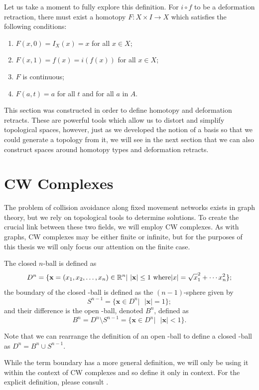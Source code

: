 Let us take a moment to fully explore this definition. For $i \circ f$ to be a deformation retraction, there must exist a homotopy $F\colon X\times I \rightarrow X$ which satisfies the following conditions:
\begin{enumerate}
\item $F(x,0)=I_X(x)=x$ for all $x \in X$;

\item $F(x,1)=f(x)=i(f(x))$ for all $x\in X$;

\item $F$ is continuous;
\item $F(a,t)=a$ for all $t$ and for all $a$ in $A$.
\end{enumerate}

This section was constructed in order to define homotopy and deformation retracts. These are powerful tools which allow us to distort and simplify topological spaces, however, just as we developed the notion of a basis so that we could generate a topology from it, we will see in the next section that we can also construct spaces around homotopy types and deformation retracts.



\section{CW Complexes}
The problem of collision avoidance along fixed movement networks exists in graph theory, but we rely on topological tools to determine solutions. To create the crucial link between these two fields, we will employ CW complexes. As with graphs, CW complexes may be either finite or infinite, but for the purposes of this thesis we will only focus our attention on the finite case.

\begin{defn}
The closed $n$-ball is defined as $$D^n=\{\textbf{x}=(x_1,x_2,\dots, x_n)\in \mathbb{R}^n |\text{  } |\textbf{x}| \leq 1 \text{ where} |x|=\sqrt x_1^2+\cdots x_n^2
 \};$$ the boundary of the closed \n-ball is defined as the $(n-1)$-sphere given by $$ S^{n-1} = \{\textbf{x}\in D^n | \text{  } |\textbf{x}|=1\};$$ and their difference is the open \n-ball, denoted $B^n$, defined as $$B^n = D^n \setminus S^{n-1} = \{\textbf{x}\in D^n | \text{  } |\textbf{x}|< 1\}.$$ 
\end{defn}
Note that we can rearrange the definition of an open \n-ball to define a closed \n-ball as $D^n= B^n \cup S^{n-1}$. 

While the term boundary has a more general definition, we will only be using it within the context of CW complexes and so define it only in context. For the explicit definition, please consult \cite{top}.


